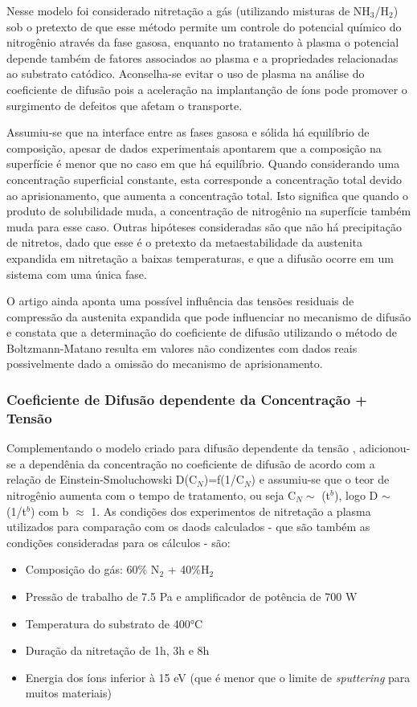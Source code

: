 \documentclass[]{politex}
\begin{document}
	Nesse modelo foi considerado nitretação a gás (utilizando misturas de NH$_3$/H$_2$) sob o pretexto de que esse método permite um controle do potencial químico do nitrogênio através da fase gasosa, enquanto no tratamento à plasma o potencial depende também de fatores associados ao plasma e a propriedades relacionadas ao substrato catódico. Aconselha-se evitar o uso de plasma na análise do coeficiente de difusão pois a aceleração na implantanção de íons pode promover o surgimento de defeitos que afetam o transporte.\par
	Assumiu-se que na interface entre as fases gasosa e sólida há equilíbrio de composição, apesar de dados experimentais apontarem que a composição na superfície é menor que no caso em que há equilíbrio. Quando considerando uma concentração superficial constante, esta corresponde a concentração total devido ao aprisionamento, que aumenta a concentração total. Isto significa que quando o produto de solubilidade muda, a concentração de nitrogênio na superfície também muda para esse caso. Outras hipóteses consideradas são que não há precipitação de nitretos, dado que esse é o pretexto da metaestabilidade da austenita expandida em nitretação a baixas temperaturas, e que a difusão ocorre em um sistema com uma única fase.\par
	O artigo ainda aponta uma possível influência das tensões residuais de compressão da austenita expandida que pode influenciar no mecanismo de difusão e constata que a determinação do coeficiente de difusão utilizando o método de Boltzmann-Matano resulta em valores não condizentes com dados reais possivelmente dado a omissão do mecanismo de aprisionamento.
	
\subsubsection{Coeficiente de Difusão dependente da Concentração + Tensão}
\label{sec:comb-depc-stress}
	Complementando o modelo criado para difusão dependente da tensão \cite{galdikas2010stress}, adicionou-se a dependênia da concentração no coeficiente de difusão de acordo com a relação de Einstein-Smoluchowski D(C$_N$)=f(1/C$_N$) \cite{moskalioviene2012stress} e assumiu-se que o teor de nitrogênio aumenta com o tempo de tratamento, ou seja C$_N\sim$ (t$^b$), logo D $\sim$ (1/t$^b$) com b $\approx$ 1.
	As condições dos experimentos de nitretação a plasma utilizados para comparação com os daods calculados - que são também as condições consideradas para os cálculos - são: 
	\begin{itemize}
	 \item Composição do gás: 60\% N$_2$ + 40\%H$_2$
	 \item Pressão de trabalho de 7.5 Pa e amplificador de potência de 700 W
	 \item Temperatura do substrato de 400°C
	 \item Duração da nitretação de 1h, 3h e 8h
  	 \item Energia dos íons inferior à 15 eV (que é menor que o limite de \textit{sputtering} para muitos materiais)
	\end{itemize}
	
\end{document}
